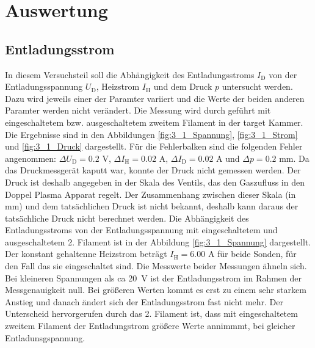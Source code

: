 \section{Auswertung}
\subsection{Entladungsstrom}\label{sec:Entladungsstrom}
In diesem Versuchsteil soll die Abhängigkeit des Entladungsstroms  $I_{\mathrm{D}}$ von der Entladungsspannung $U_{\mathrm{D}}$, Heizstrom $I_{\mathrm{H}}$ und dem Druck $p$ untersucht werden. Dazu wird jeweils einer der Paramter variiert und die Werte der beiden anderen Paramter werden nicht verändert. Die Messung wird durch geführt mit eingeschaltetem bzw. ausgeschaltetem  zweitem Filament in der target Kammer. Die Ergebnisse sind in den Abbildungen \ref{fig:3_1_Spannung}, \ref{fig:3_1_Strom} und \ref{fig:3_1_Druck} dargestellt. Für die Fehlerbalken sind die folgenden Fehler angenommen: $\Delta U_{\mathrm{D}} = 0.2 $ V, $\Delta I_{\mathrm{H}} = 0.02$ A, $\Delta I_{\mathrm{D}} = 0.02$ A und  $\Delta p = 0.2 $ mm. Da das Druckmessgerät kaputt war, konnte der Druck nicht gemessen werden. Der Druck ist deshalb angegeben in der Skala des Ventils, das den Gaszufluss in den Doppel Plasma Apparat regelt. Der Zusammenhang zwischen dieser Skala (in mm) und dem tatsächlichen Druck ist nicht bekannt, deshalb kann daraus der tatsächliche Druck nicht berechnet werden. Die Abhängigkeit des Entladungsstroms von der Entladungsspannung mit eingeschaltetem und ausgeschaltetem 2. Filament ist in der Abbildung \ref{fig:3_1_Spannung} dargestellt. Der konstant gehaltenne Heizstrom beträgt $ I_{\mathrm{H}} =6.00$ A für beide Sonden, für den Fall das sie eingeschaltet sind. Die Messwerte beider Messungen ähneln sich. Bei kleineren Spannungen als ca \SI{20}{V} ist der Entladungsstrom im Rahmen der Messgenauigkeit null. Bei größeren Werten kommt es erst zu einem sehr starkem Anstieg und danach ändert sich der Entladungsstrom fast nicht mehr. Der Unterscheid hervorgerufen durch das 2. Filament ist, dass mit eingeschaltetem zweitem Filament der Entladungstrom größere Werte annimmmt, bei gleicher Entladunsgspannung.  
